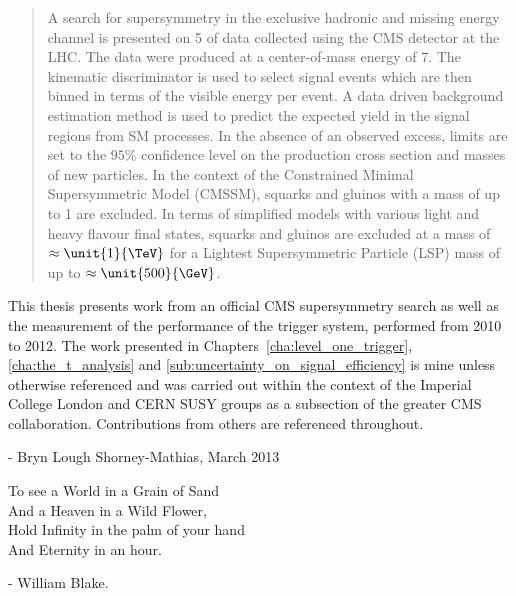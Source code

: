 \begin{abstract}
A search for supersymmetry in the exclusive hadronic and missing energy channel 
is presented on \unit{5}{\invfb} of data collected using the CMS detector at 
the LHC. The data were produced at a center-of-mass energy of \unit{7}{\TeV}. 
The kinematic discriminator \alt is used to select signal events which are then 
binned in terms of the visible energy per event. A data driven background 
estimation method is used to predict the expected yield in the signal regions 
from SM processes. In the absence of an observed excess, limits are 
set to the $95\%$ confidence level on the production cross section and masses 
of new particles. In the context of the Constrained Minimal Supersymmetric Model (CMSSM), squarks and gluinos with a mass 
of up to \unit{1}{\TeV} are excluded. In terms of simplified models with 
various light and heavy flavour final states, squarks and gluinos are excluded 
at a mass of $\approx\unit{1}{\TeV}$ for a Lightest Supersymmetric Particle (LSP) mass of up to 
$\approx\unit{500}{\GeV}$.


\end{abstract}


\begin{declaration}
This thesis presents work from an official CMS supersymmetry search as well as 
the measurement of the performance of the \Lone trigger system, performed from 
2010 to 2012. The work presented in Chapters~\ref{cha:level_one_trigger}, 
\ref{cha:the_t_analysis} and \ref{sub:uncertainty_on_signal_efficiency} is mine 
unless otherwise referenced and was carried out within the context of the 
Imperial College London and CERN SUSY groups as a subsection of the greater CMS 
collaboration. Contributions from others are referenced throughout.

\vspace*{1cm}

\begin{flushright}
- Bryn Lough Shorney-Mathias, March 2013
\end{flushright}

\end{declaration}


\begin{preface}
\begin{centering}To see a World in a Grain of Sand\\
And a Heaven in a Wild Flower,\\
Hold Infinity in the palm of your hand \\
And Eternity in an hour.\\
\end{centering}

\begin{flushright}
- William Blake.
\end{flushright}
\end{preface}

